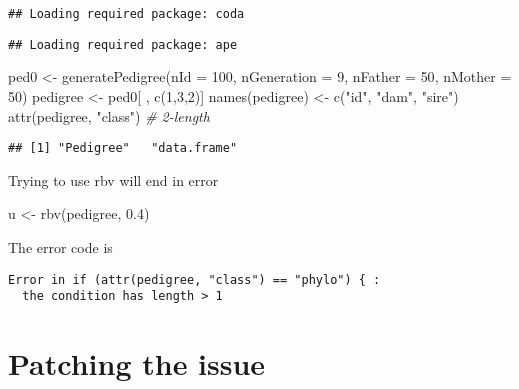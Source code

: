 \documentclass[
]{article}
\newenvironment{Shaded}{\begin{snugshade}}{\end{snugshade}}
\newcommand{\AttributeTok}[1]{\textcolor[rgb]{0.77,0.63,0.00}{#1}}
\newcommand{\CommentTok}[1]{\textcolor[rgb]{0.56,0.35,0.01}{\textit{#1}}}
\newcommand{\DecValTok}[1]{\textcolor[rgb]{0.00,0.00,0.81}{#1}}
\newcommand{\FloatTok}[1]{\textcolor[rgb]{0.00,0.00,0.81}{#1}}
\newcommand{\FunctionTok}[1]{\textcolor[rgb]{0.00,0.00,0.00}{#1}}
\newcommand{\NormalTok}[1]{#1}
\newcommand{\OtherTok}[1]{\textcolor[rgb]{0.56,0.35,0.01}{#1}}
\newcommand{\StringTok}[1]{\textcolor[rgb]{0.31,0.60,0.02}{#1}}
\begin{document}
\begin{verbatim}
## Loading required package: coda
\end{verbatim}

\begin{verbatim}
## Loading required package: ape
\end{verbatim}

\begin{Shaded}
\begin{Highlighting}[]
\NormalTok{ped0 }\OtherTok{\textless{}{-}} \FunctionTok{generatePedigree}\NormalTok{(}\AttributeTok{nId =} \DecValTok{100}\NormalTok{, }\AttributeTok{nGeneration =} \DecValTok{9}\NormalTok{, }
                         \AttributeTok{nFather =} \DecValTok{50}\NormalTok{, }\AttributeTok{nMother =} \DecValTok{50}\NormalTok{)}
\NormalTok{pedigree }\OtherTok{\textless{}{-}}\NormalTok{ ped0[ , }\FunctionTok{c}\NormalTok{(}\DecValTok{1}\NormalTok{,}\DecValTok{3}\NormalTok{,}\DecValTok{2}\NormalTok{)]}
\FunctionTok{names}\NormalTok{(pedigree) }\OtherTok{\textless{}{-}} \FunctionTok{c}\NormalTok{(}\StringTok{"id"}\NormalTok{, }\StringTok{"dam"}\NormalTok{, }\StringTok{"sire"}\NormalTok{)}
\FunctionTok{attr}\NormalTok{(pedigree, }\StringTok{"class"}\NormalTok{) }\CommentTok{\# 2{-}length}
\end{Highlighting}
\end{Shaded}

\begin{verbatim}
## [1] "Pedigree"   "data.frame"
\end{verbatim}

Trying to use rbv will end in error

\begin{Shaded}
\begin{Highlighting}[]
\NormalTok{u }\OtherTok{\textless{}{-}} \FunctionTok{rbv}\NormalTok{(pedigree, }\FloatTok{0.4}\NormalTok{)}
\end{Highlighting}
\end{Shaded}

The error code is

\begin{verbatim}
Error in if (attr(pedigree, "class") == "phylo") { : 
  the condition has length > 1
\end{verbatim}

\hypertarget{patching-the-issue}{%
\section{Patching the issue}\label{patching-the-issue}}
\end{document}
